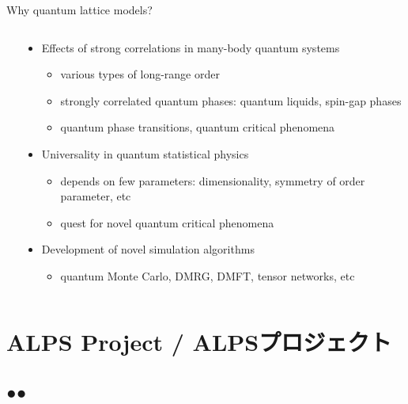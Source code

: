 \begin{frame}[t,fragile]{Why quantum lattice models?}
\begin{columns}[T]
\begin{column}{.2\textwidth}
    \end{column}
    \begin{column}{.8\textwidth}
      \begin{itemize}
      \item Effects of strong correlations in many-body quantum systems
        \begin{itemize}
        \item various types of long-range order
        \item strongly correlated quantum phases: quantum liquids, spin-gap phases
        \item quantum phase transitions, quantum critical phenomena
        \end{itemize}
      \item Universality in quantum statistical physics
        \begin{itemize}
        \item depends on few parameters: dimensionality, symmetry of order parameter, etc
        \item quest for novel quantum critical phenomena
        \end{itemize}
      \item Development of novel simulation algorithms
        \begin{itemize}
        \item quantum Monte Carlo, DMRG, DMFT, tensor networks, etc
        \end{itemize}
      \end{itemize}
    \end{column}
  \end{columns}
\end{frame}

\section{ALPS Project / ALPSプロジェクト}
\subsection*{{\protect\color{red}●}{\protect\color{blue}●}}

